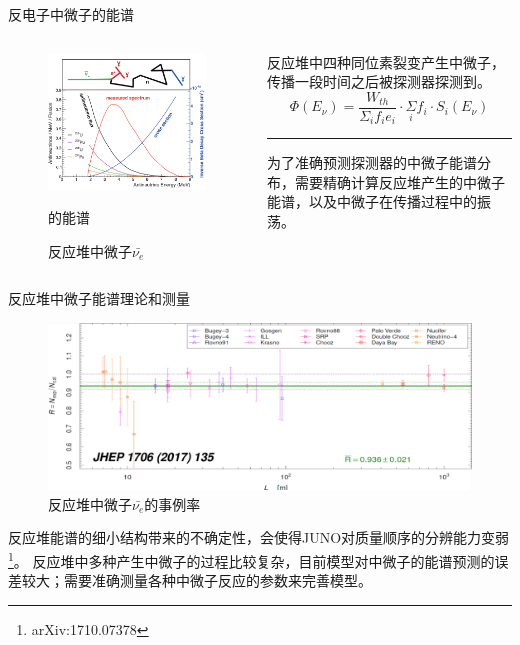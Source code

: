 \documentclass[11pt,compress,xcolor=x11names,UTF8]{beamer}
\begin{document}
\begin{frame}{反电子中微子的能谱}
\begin{columns}
\begin{column}{.5\textwidth}
\begin{figure}
\centering
\includegraphics[width=\textwidth]{K_ibdspec} %
\caption{反应堆中微子$\bar{\nu_e}$}的能谱
\end{figure}
\end{column}
\begin{column}{.45\textwidth}
反应堆中四种同位素裂变产生中微子，传播一段时间之后被探测器探测到。
\[
\Phi(E_{\nu})=\frac{W_{th}}{\Sigma_{i} f_{i}e_{i}}\cdot\Sigma\limits_{i} f_{i}\cdot S_{i}(E_{\nu})
\]
\vspace{.1cm}

\hrule{\textwidth}
\vspace{.5cm}
为了准确预测探测器的中微子能谱分布，需要精确计算反应堆{\color{blue}产生的中微子能谱}，以及中微子在{\color{blue}传播过程中的振荡}。
\end{column}
\end{columns}
\end{frame}
\begin{frame}{反应堆中微子能谱理论和测量}
\begin{figure}
\centering
\includegraphics[width=.8\textwidth]{K_rate} %
\caption{反应堆中微子$\bar{\nu_e}$的事例率}
\end{figure}
反应堆能谱的细小结构带来的不确定性，会使得JUNO对质量顺序的分辨能力变弱\footnote{ arXiv:1710.07378}。
反应堆中多种产生中微子的过程比较复杂，目前模型对中微子的能谱预测的误差较大；需要准确测量各种中微子反应的参数来完善模型。
\end{frame}
\end{document}
